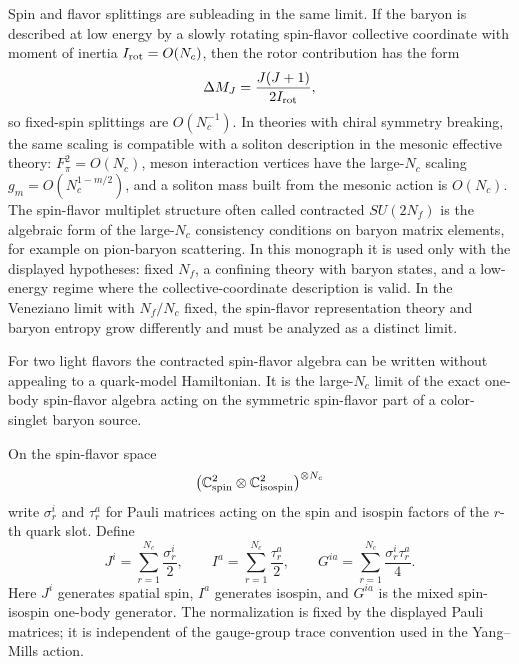 Spin and flavor splittings are subleading in the same limit.  If the baryon is
described at low energy by a slowly rotating spin-flavor collective coordinate
with moment of inertia \(I_{\rm rot}=O(N_c)\), then the rotor contribution has
the form
\begin{equation}
  \Delta M_J
  =
  \frac{J(J+1)}{2I_{\rm rot}},
  \label{eq:qcd-large-n-baryon-rotor-splitting}
\end{equation}
so fixed-spin splittings are \(O(N_c^{-1})\).  In theories with chiral
symmetry breaking, the same scaling is compatible with a soliton description
in the mesonic effective theory: \(F_\pi^2=O(N_c)\), meson interaction
vertices have the large-\(N_c\) scaling \(g_m=O(N_c^{1-m/2})\), and a soliton
mass built from the mesonic action is \(O(N_c)\).  The spin-flavor multiplet
structure often
called contracted \(SU(2N_f)\) is the algebraic form of the large-\(N_c\)
consistency conditions on baryon matrix elements, for example on pion-baryon
scattering.  In this monograph it is used only with the displayed hypotheses:
fixed \(N_f\), a confining theory with baryon states, and a low-energy regime
where the collective-coordinate description is valid.  In the Veneziano limit
with \(N_f/N_c\) fixed, the spin-flavor representation theory and baryon
entropy grow differently and must be analyzed as a distinct limit.

For two light flavors the contracted spin-flavor algebra can be written
without appealing to a quark-model Hamiltonian.  It is the large-\(N_c\)
limit of the exact one-body spin-flavor algebra acting on the symmetric
spin-flavor part of a color-singlet baryon source.

\begin{definition}
\label{def:qcd-two-flavor-spin-flavor-generators}
On the spin-flavor space
\[
  \left(\mathbb C^2_{\rm spin}\otimes\mathbb C^2_{\rm isospin}\right)^{\otimes N_c}
\]
write \(\sigma_r^i\) and \(\tau_r^a\) for Pauli matrices acting on the spin
and isospin factors of the \(r\)-th quark slot.  Define
\begin{equation}
  J^i=\sum_{r=1}^{N_c}\frac{\sigma_r^i}{2},
  \qquad
  I^a=\sum_{r=1}^{N_c}\frac{\tau_r^a}{2},
  \qquad
  G^{ia}=\sum_{r=1}^{N_c}\frac{\sigma_r^i\tau_r^a}{4}.
  \label{eq:qcd-two-flavor-spin-flavor-generators}
\end{equation}
Here \(J^i\) generates spatial spin, \(I^a\) generates isospin, and
\(G^{ia}\) is the mixed spin-isospin one-body generator.  The normalization is
fixed by the displayed Pauli matrices; it is independent of the gauge-group
trace convention used in the Yang--Mills action.
\end{definition}

